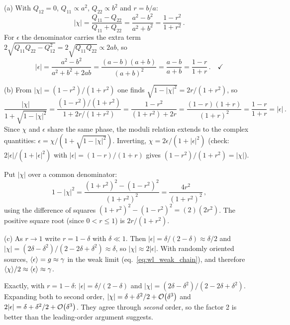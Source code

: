 (a) With $Q_{12} = 0$, $Q_{11} \propto a^2$, $Q_{22} \propto b^2$
and $r = b/a$:
\begin{equation*}
    |\chi| = \frac{Q_{11} - Q_{22}}{Q_{11} + Q_{22}}
    = \frac{a^2 - b^2}{a^2 + b^2}
    = \frac{1 - r^2}{1 + r^2}\,.
\end{equation*}
For $\epsilon$ the denominator carries the extra term
$2\sqrt{Q_{11}Q_{22} - Q_{12}^2} = 2\sqrt{Q_{11}Q_{22}} \propto 2ab$, so
\begin{equation*}
    |\epsilon| = \frac{a^2 - b^2}{a^2 + b^2 + 2ab}
    = \frac{(a-b)(a+b)}{(a+b)^2}
    = \frac{a - b}{a + b}
    = \frac{1 - r}{1 + r}\,. \quad \checkmark
\end{equation*}

(b) From $|\chi| = (1-r^2)/(1+r^2)$ one finds
$\sqrt{1 - |\chi|^2} = 2r/(1+r^2)$, so
\begin{equation*}
    \frac{|\chi|}{1 + \sqrt{1-|\chi|^2}}
    = \frac{(1-r^2)/(1+r^2)}{1 + 2r/(1+r^2)}
    = \frac{1 - r^2}{(1+r^2) + 2r}
    = \frac{(1-r)(1+r)}{(1+r)^2}
    = \frac{1-r}{1+r} = |\epsilon|\,.
\end{equation*}
Since $\chi$ and $\epsilon$ share the same phase, the moduli relation
extends to the complex quantities:
$\epsilon = \chi/(1+\sqrt{1-|\chi|^2})$.  Inverting,
$\chi = 2\epsilon/(1+|\epsilon|^2)$ (check:
$2|\epsilon|/(1+|\epsilon|^2)$ with $|\epsilon| = (1-r)/(1+r)$ gives
$(1-r^2)/(1+r^2) = |\chi|$). \checkmark

\begin{derivation}
Put $|\chi|$ over a common denominator:
\begin{equation*}
    1 - |\chi|^2 = \frac{(1+r^2)^2 - (1-r^2)^2}{(1+r^2)^2}
    = \frac{4r^2}{(1+r^2)^2}\,,
\end{equation*}
using the difference of squares $(1+r^2)^2 - (1-r^2)^2 = (2)(2r^2)$.  The
positive square root (since $0 < r \le 1$) is $2r/(1+r^2)$.
\end{derivation}

(c) As $r \to 1$ write $r = 1 - \delta$ with $\delta \ll 1$.
Then $|\epsilon| = \delta/(2-\delta) \approx \delta/2$ and
$|\chi| = (2\delta - \delta^2)/(2 - 2\delta + \delta^2) \approx \delta$,
so $|\chi| \approx 2|\epsilon|$.  With randomly oriented sources,
$\langle\epsilon\rangle = g \approx \gamma$ in the weak limit
(eq.~\ref{eq:wl_weak_chain}), and therefore
$\langle\chi\rangle/2 \approx \langle\epsilon\rangle \approx \gamma$.
\checkmark

\begin{derivation}
Exactly, with $r = 1-\delta$: $|\epsilon| = \delta/(2-\delta)$ and
$|\chi| = (2\delta-\delta^2)/(2-2\delta+\delta^2)$.  Expanding both to second
order, $|\chi| = \delta + \delta^2/2 + \mathcal{O}\!\left(\delta^3\right)$ and
$2|\epsilon| = \delta + \delta^2/2 + \mathcal{O}\!\left(\delta^3\right)$.  They agree through
\emph{second} order, so the factor 2 is better than the leading-order
argument suggests.
\end{derivation}


